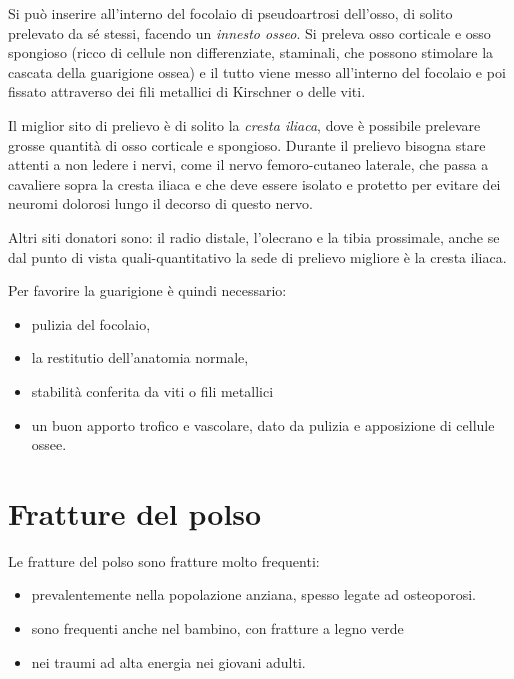 Si può inserire all'interno del focolaio di pseudoartrosi dell'osso, di solito prelevato da sé stessi, facendo un \emph{innesto osseo}. Si
preleva osso corticale e osso spongioso (ricco di cellule non differenziate, staminali, che possono stimolare la cascata della guarigione ossea) e il tutto viene messo all'interno del focolaio e poi
fissato attraverso dei fili metallici di Kirschner o delle viti.

Il miglior sito di prelievo è di solito la \emph{cresta iliaca}, dove è possibile prelevare grosse quantità di osso corticale e spongioso.
Durante il prelievo bisogna stare attenti a non ledere i nervi, come il nervo femoro-cutaneo laterale, che passa a cavaliere sopra la cresta
iliaca e che deve essere isolato e protetto per evitare dei neuromi dolorosi lungo il decorso di questo nervo.

Altri siti donatori sono: il radio distale, l'olecrano e la tibia
prossimale, anche se dal punto di vista quali-quantitativo la sede di
prelievo migliore è la cresta iliaca.

Per favorire la guarigione è quindi necessario:

\begin{itemize}
\item
  pulizia del focolaio,
\item
  la restitutio dell'anatomia normale,
\item
  stabilità conferita da viti o fili metallici
\item
  un buon apporto trofico e vascolare, dato da pulizia e apposizione di cellule ossee.
\end{itemize}

\section{Fratture del polso}

Le fratture del polso sono fratture molto frequenti:

\begin{itemize}
\item
  prevalentemente nella popolazione anziana, spesso legate ad osteoporosi.
\end{itemize}

\begin{itemize}
\item
  sono frequenti anche nel bambino, con fratture a legno verde
\item
  nei traumi ad alta energia nei giovani adulti.
\end{itemize}

